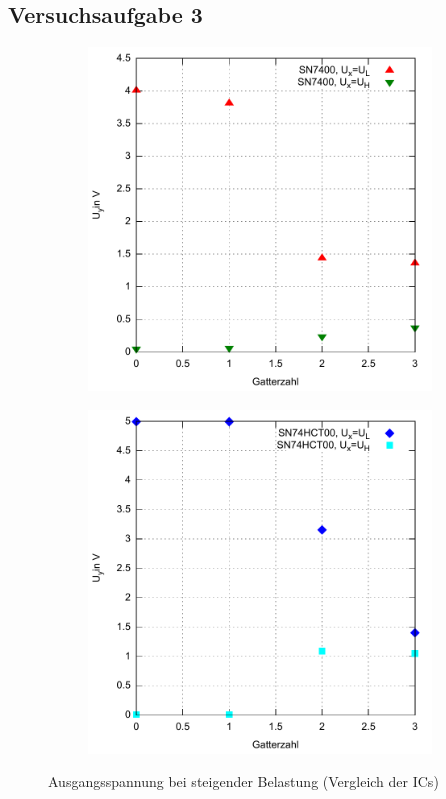 \documentclass[numbers=noenddot,12pt,a4paper]{scrartcl}
\begin{document}
\subsection{Versuchsaufgabe 3}
\begin{figure}[H]
\centering
\begin{subfigure}[b]{0.48\textwidth}
\includegraphics[width=\textwidth]{aufg3_1.pdf}
\end{subfigure}
\begin{subfigure}[b]{0.48\textwidth}
\includegraphics[width=\textwidth]{aufg3_2.pdf}
\end{subfigure}
\caption{Ausgangsspannung bei steigender Belastung (Vergleich der ICs)}
\end{figure}
\end{document}
